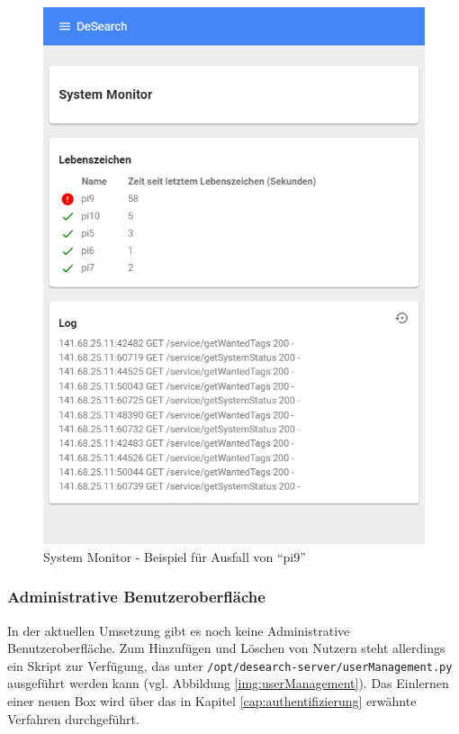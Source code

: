 \begin{figure}
	\centering
	\includegraphics[width=1.0\linewidth]{images/ui/systemMonitor}
	\caption[System Monitor]{System Monitor - Beispiel für Ausfall von \enquote{pi9}}
	\label{img:ui/systemMonitor}
\end{figure}


\subsubsection{Administrative Benutzeroberfläche}
In der aktuellen Umsetzung gibt es noch keine Administrative Benutzeroberfläche. Zum Hinzufügen und Löschen von Nutzern steht allerdings ein Skript zur Verfügung, das unter  \texttt{/opt/desearch-server/userManagement.py} ausgeführt werden kann (vgl. Abbildung \ref{img:userManagement}).
Das Einlernen einer neuen Box wird über das in Kapitel \ref{cap:authentifizierung} erwähnte Verfahren durchgeführt.

